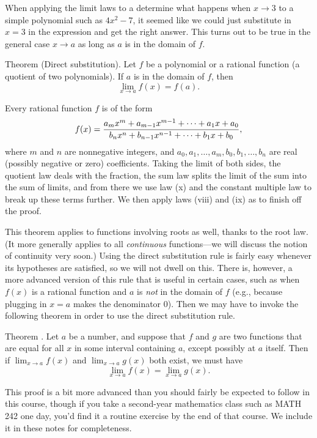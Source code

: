 When applying the limit laws to a determine what happens when $x\to 3$ to a
simple polynomial such as $4x^2-7$, it seemed like
we could just substitute in $x=3$ in the expression and get the right answer. This turns out to be true in
the general case $x\to a$ as long as $a$ is in the domain of $f$.

\edef\thmdirectsub{\the\thmcount}
\parenproclaim Theorem {\advthm} (Direct substitution).
Let $f$ be a polynomial or a rational function (a quotient of two polynomials). If $a$ is in the domain of
$f$, then
$$\lim_{x\to a} f(x) = f(a).$$

\proof Every rational function $f$ is of the form
$$f(x) = {a_m x^m + a_{m-1} x^{m-1} + \cdots + a_1 x + a_0
\over b_n x^n + b_{n-1}x^{n-1} + \cdots + b_1 x + b_0},$$
where $m$ and $n$ are nonnegative integers, and $a_0,a_1,\ldots,a_m,b_0,b_1,\ldots,b_n$
are real (possibly negative or zero) coefficients.
Taking the limit of both sides, the
quotient law deals with the fraction, the sum law splits the limit of the sum into the sum of limits, and
from there we use law (x) and the constant multiple law to break up these terms further. We then apply
laws (viii) and (ix) as to finish off the proof.\slug

This theorem applies to functions involving roots as well, thanks to the root law. (It more generally
applies to all {\it continuous} functions---we will discuss the notion of continuity very soon.)
Using the direct substitution rule is fairly easy whenever its hypotheses are satisfied,
so we will not dwell on this.
There is, however, a more advanced version of this rule that is useful in certain cases, such as when
$f(x)$ is a rational
function and $a$ is {\it not} in the domain of $f$ (e.g., because plugging in $x=a$ makes the denominator $0$).
Then we may have to invoke the following theorem in order to use the direct substitution rule.

\edef\thmlimequal{\the\thmcount}
\proclaim Theorem \advthm. Let $a$ be a number, and suppose that $f$ and $g$ are two functions
that are equal for all $x$ in some interval containing $a$, except possibly at $a$ itself.
Then if $\lim_{x\to a} f(x)$ and $\lim_{x\to a} g(x)$ both exist, we must have
$$\lim_{x\to a} f(x) = \lim_{x\to a} g(x).$$

\optproof This proof is a bit more advanced than you should fairly be expected to follow in this course,
though if you take a second-year mathematics class such as {\mc MATH} 242 one day,
you'd find it a routine exercise by the end of that course.
We include it in these notes for completeness.

